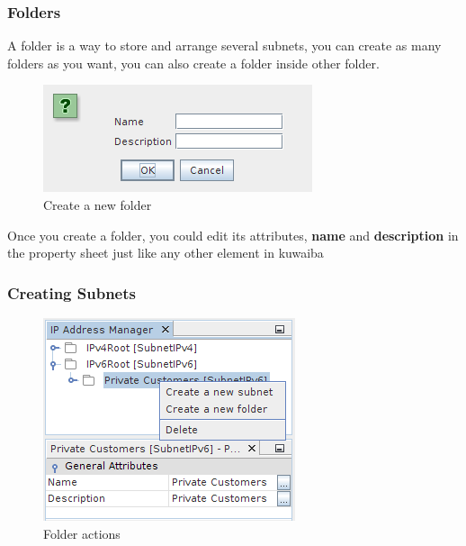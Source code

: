 \documentclass[a4paper]{article}
\begin{document}
		\subsubsection{Folders}
		A folder is a way to store and arrange several subnets, you can create as many folders as you want, you can also create a folder inside other folder.
		\begin{figure}[h!]
			\centering
			\includegraphics[width=0.4\linewidth]{img/ipam_create_new_folder.png}
			\caption{Create a new folder}
			\label{fig:ipam_create_new_folder}
		\end{figure}
		
		Once you create a folder, you could edit its attributes, \textbf{name} and \textbf{description} in the property sheet just like any other element in kuwaiba

		\subsubsection{Creating Subnets}
		\begin{figure}[h!]
			\centering
			\includegraphics[width=0.4\linewidth]{img/ipam_folder_actions.png}
			\caption{Folder actions}
			\label{fig:ipam_folder_actions}
		\end{figure}
	
\end{document}
